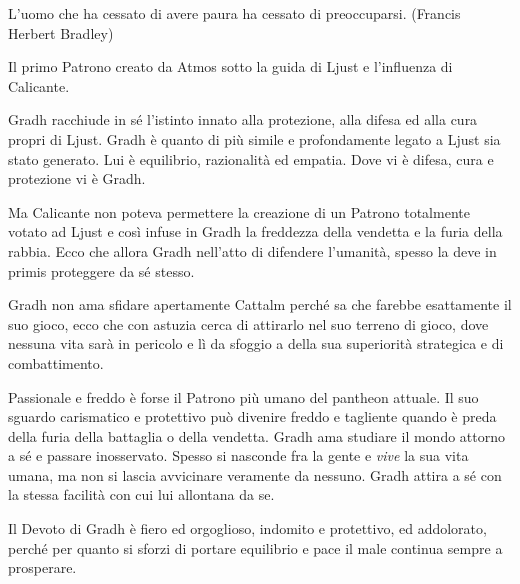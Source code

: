 \begin{multicols}{2}
\begin{changemargin}{0.3cm}{0.3cm}\begin{enfasi}
L'uomo che ha cessato di avere paura ha cessato di preoccuparsi. (Francis Herbert Bradley)
\end{enfasi}\end{changemargin}\medskip

Il primo Patrono creato da Atmos sotto la guida di Ljust e l'influenza di Calicante.

Gradh racchiude in sé l'istinto innato alla protezione, alla difesa ed alla cura propri di Ljust. Gradh è quanto di più simile e profondamente legato a Ljust sia stato generato. Lui è equilibrio, razionalità ed empatia.
Dove vi è difesa, cura e protezione vi è Gradh.

Ma Calicante non poteva permettere la creazione di un Patrono totalmente votato ad Ljust e così infuse in Gradh la freddezza della vendetta e la furia della rabbia. Ecco che allora Gradh nell'atto di difendere l'umanità, spesso la deve in primis proteggere da sé stesso.

Gradh non ama sfidare apertamente Cattalm perché sa che farebbe esattamente il suo gioco, ecco che con astuzia cerca di attirarlo nel suo terreno di gioco, dove nessuna vita sarà in pericolo e lì da sfoggio a della sua superiorità strategica e di combattimento.

Passionale e freddo è forse il Patrono più umano del pantheon attuale. Il suo sguardo carismatico e protettivo può divenire freddo e tagliente quando è preda della furia della battaglia o della vendetta. Gradh ama studiare il mondo attorno a sé e passare inosservato. Spesso si nasconde fra la gente e \emph{vive} la sua vita umana, ma non si lascia avvicinare veramente da nessuno. Gradh attira a sé con la stessa facilità con cui lui allontana da se.

Il Devoto di Gradh è fiero ed orgoglioso, indomito e protettivo, ed addolorato, perché per quanto si sforzi di portare equilibrio e pace il male continua sempre a prosperare.


\end{multicols}
